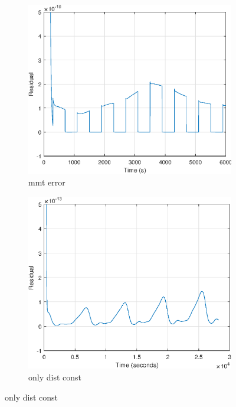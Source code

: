 
\begin{figure}[H]
	\begin{subfigure}{0.5\linewidth}
	\centering
	\includegraphics[width=1\linewidth]{figures/mt_fault_res}
	\caption{mmt error}
	\label{fig:residualmt}
	\end{subfigure}
	\begin{subfigure}{0.5\linewidth}
	\centering
	\includegraphics[width=1\linewidth]{figures/constdistonly_res}
	\caption{only dist const}
	\label{fig:residualdist}	
	\end{subfigure}
\end{figure}

